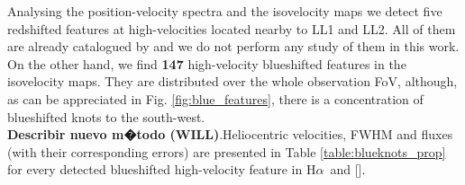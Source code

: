\documentclass[a4paper,fleqn,usenatbib]{mnras}     %
\newcommand{\Ha} {H$\alpha$}      		%
\newcommand{\NII} {[\ion{N}{ii}]}            %
\begin{document}
Analysing the position-velocity spectra and the isovelocity maps we detect five redshifted features at high-velocities located nearby to LL1 and LL2. All of them are 
already catalogued by \citet{Henney2013} and we do not perform any study of them in this work. On the other hand, we find \textbf{147} high-velocity 
blueshifted features in the isovelocity maps. They are distributed over the whole observation FoV, although, as can be appreciated in 
Fig. \ref{fig:blue_features}, there is a concentration of blueshifted knots to the south-west.\\
\textbf{Describir nuevo m�todo (WILL)}.Heliocentric velocities, FWHM and fluxes (with their corresponding errors) are presented in Table
\ref{table:blueknots_prop} for every detected blueshifted high-velocity feature in \Ha~and \NII. 
\end{document}
